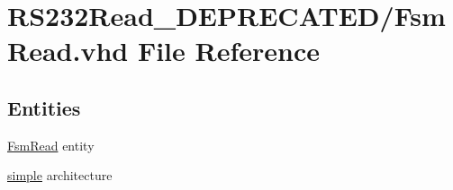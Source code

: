 \hypertarget{_d_e_p_r_e_c_a_t_e_d_2_fsm_read_8vhd}{}\section{R\+S232\+Read\+\_\+\+D\+E\+P\+R\+E\+C\+A\+T\+E\+D/\+Fsm\+Read.vhd File Reference}
\label{_d_e_p_r_e_c_a_t_e_d_2_fsm_read_8vhd}
\subsection*{Entities}
\begin{DoxyCompactItemize}
\item 
\hyperlink{class_fsm_read}{Fsm\+Read} entity
\item 
\hyperlink{class_fsm_read_1_1simple}{simple} architecture
\end{DoxyCompactItemize}
